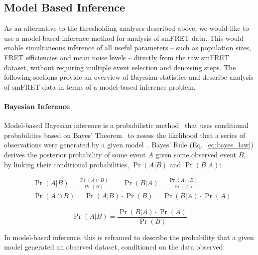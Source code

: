 
\subsection{Model Based Inference}
As an alternative to the thresholding analyses described above, we would like to use a model-based inference method for analysis of smFRET data. This would enable simultaneous inference of all useful parameters -- such as population sizes, FRET efficiencies and mean noise levels -- directly from the raw smFRET dataset, without requiring multiple event selection and denoising steps. The following sections provide an overview of Bayesian statistics and describe analysis of smFRET data in terms of a model-based inference problem. 

\paragraph{Bayesian Inference}
Model-based Bayesian inference is a probabilistic method~\cite{barber12} that uses conditional probabilities based on Bayes' Theorem~\cite{bayes63} to assess the likelihood that a series of observations were generated by a given model~\cite{mackay03}. Bayes' Rule (Eq.~\ref{eq:bayes_law}) derives the posterior probability of some event $A$ given some observed event $B$,  by linking their conditional probabilities, $\Pr(A|B)$ and $\Pr(B|A)$: 

\begin{equation}
\begin{aligned}
& \Pr(A|B) = \frac{\Pr(A \cap B)}{\Pr(B)} \qquad \Pr(B|A) = \frac{\Pr(A \cap B)}{\Pr(A)} \\
& \Pr(A \cap B) = \Pr(A|B) \cdot \Pr(B) = \Pr(B|A) \cdot \Pr(A)
\end{aligned}
\label{eq:conditional}
\end{equation} 

\begin{equation}
\Pr(A|B) = \frac{\Pr(B|A) \cdot \Pr(A)}{\Pr(B)} 
\label{eq:bayes_law}
\end{equation}

In model-based inference, this is reframed to describe the probability that a given model generated an observed dataset, conditioned on the data observed:


